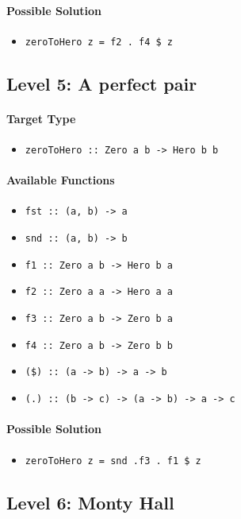\documentclass[preprint,12pt]{elsarticle}
\begin{document}
\paragraph{Possible Solution} 
\begin{itemize}
    \item \texttt{zeroToHero z = f2 . f4 \$ z}
\end{itemize}


\subsection{Level 5: A perfect pair}
\paragraph{Target Type } 
\begin{itemize}
    \item \texttt{zeroToHero :: Zero a b -> Hero b b}
\end{itemize}

\paragraph{Available Functions} 
\begin{itemize}
    \item \texttt{fst :: (a, b) -> a}
    \item \texttt{snd :: (a, b) -> b}
    \item \texttt{f1 :: Zero a b -> Hero b a}
    \item \texttt{f2 :: Zero a a -> Hero a a}
    \item \texttt{f3 :: Zero a b -> Zero b a}
    \item \texttt{f4 :: Zero a b -> Zero b b}
    \item \texttt{(\$) :: (a -> b) -> a -> b}
    \item \texttt{(.) :: (b -> c) -> (a -> b) -> a -> c}
\end{itemize}

\paragraph{Possible Solution} 
\begin{itemize}
    \item \texttt{zeroToHero z = snd .f3 . f1 \$ z}
\end{itemize}


\subsection{Level 6: Monty Hall}
\end{document}
